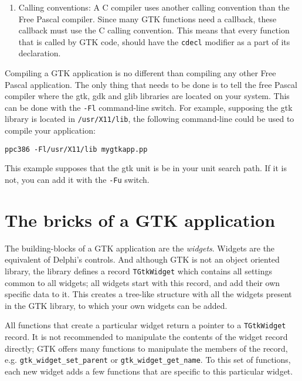 \documentclass[10pt]{article}
\begin{document}
\begin{enumerate}
can be used to retrieve the widget flags, but not to set them. so things like 
\begin{lstlisting}{invaliduseofmacro}
GTK_WIDGET_FLAGS(wid):=GTK_WIDGET_FLAGS(wid) and someflag;
\end{lstlisting}
will not work, since this is a function, and NOT a macro as in C. 
\item Calling conventions: A C compiler uses another calling convention 
than the Free Pascal compiler. Since many GTK functions need a callback,
these callback must use the C calling convention. This means that every
function that is called by GTK code, should have the \lstinline|cdecl| 
modifier as a part of its declaration.
\end{enumerate}

Compiling a GTK application is no different than compiling any other Free
Pascal application. The only thing that needs to be done is to tell the free
Pascal compiler where the gtk, gdk and glib libraries are located on your
system. This can be done with the \verb|-Fl| command-line switch. For
example, supposing the gtk library is located in \verb|/usr/X11/lib|, the
following command-line could be used to compile your application:
\begin{verbatim}
ppc386 -Fl/usr/X11/lib mygtkapp.pp
\end{verbatim}
This example supposes that the gtk unit is be in your unit search path. If
it is not, you can add it with the \verb|-Fu| switch.

\section{The bricks of a GTK application}
The building-blocks of a GTK application are the {\em widgets}. 
Widgets are the equivalent of Delphi's controls. And although GTK 
is not an object oriented library, the library defines a record 
\lstinline|TGtkWidget| which contains all settings common to all
widgets; all widgets start with this record, and add their own 
specific data to it. This creates a tree-like structure with all 
the widgets present in the GTK library, to which your own widgets 
can be added.

All functions that create a particular widget return a pointer
to a \lstinline|TGtkWidget| record. It is not recommended to 
manipulate the contents of the widget record directly; GTK offers 
many functions to manipulate the members of the record, e.g.  
\lstinline|gtk_widget_set_parent| or \lstinline|gtk_widget_get_name|.
To this set of functions, each new widget adds a few functions that are 
specific to this particular widget. 
\end{document}
